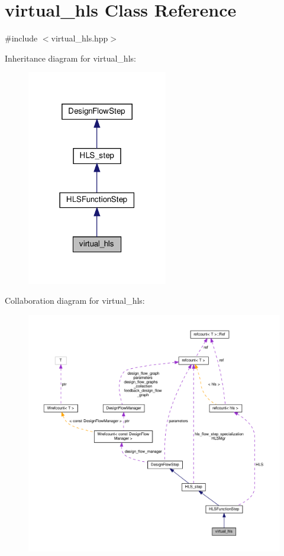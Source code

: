 \hypertarget{classvirtual__hls}{}\section{virtual\+\_\+hls Class Reference}
\label{classvirtual__hls}


{\ttfamily \#include $<$virtual\+\_\+hls.\+hpp$>$}



Inheritance diagram for virtual\+\_\+hls\+:
\nopagebreak
\begin{figure}[H]
\begin{center}
\leavevmode
\includegraphics[width=174pt]{d0/dff/classvirtual__hls__inherit__graph}
\end{center}
\end{figure}


Collaboration diagram for virtual\+\_\+hls\+:
\nopagebreak
\begin{figure}[H]
\begin{center}
\leavevmode
\includegraphics[width=350pt]{d8/d7d/classvirtual__hls__coll__graph}
\end{center}
\end{figure}
